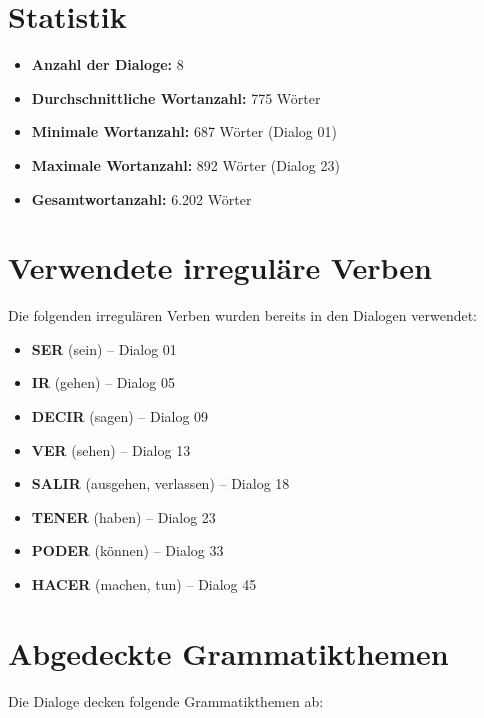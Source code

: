 \documentclass[12pt,a4paper]{article}
\begin{document}
\vspace{2em}

\section*{Statistik}

\begin{itemize}
    \item \textbf{Anzahl der Dialoge:} 8
    \item \textbf{Durchschnittliche Wortanzahl:} 775 Wörter
    \item \textbf{Minimale Wortanzahl:} 687 Wörter (Dialog 01)
    \item \textbf{Maximale Wortanzahl:} 892 Wörter (Dialog 23)
    \item \textbf{Gesamtwortanzahl:} 6.202 Wörter
\end{itemize}

\vspace{2em}

\section*{Verwendete irreguläre Verben}

Die folgenden irregulären Verben wurden bereits in den Dialogen verwendet:

\begin{itemize}
    \item \textbf{SER} (sein) -- Dialog 01
    \item \textbf{IR} (gehen) -- Dialog 05
    \item \textbf{DECIR} (sagen) -- Dialog 09
    \item \textbf{VER} (sehen) -- Dialog 13
    \item \textbf{SALIR} (ausgehen, verlassen) -- Dialog 18
    \item \textbf{TENER} (haben) -- Dialog 23
    \item \textbf{PODER} (können) -- Dialog 33
    \item \textbf{HACER} (machen, tun) -- Dialog 45
\end{itemize}

\vspace{2em}

\section*{Abgedeckte Grammatikthemen}

Die Dialoge decken folgende Grammatikthemen ab:
\end{document}
